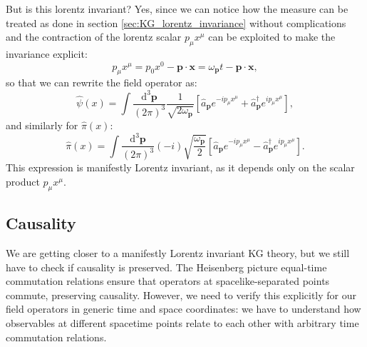 But is this lorentz invariant? Yes, since we can notice how the measure can be treated as done in section \ref{sec:KG_lorentz_invariance} without complications and the contraction of the lorentz scalar \(p_{\mu}x^{\mu}\) can be exploited to make the invariance explicit:
\[
    p_\mu x^{\mu} = p_0 x^0 - \mathbf{p} \cdot \mathbf{x} = \omega_{\mathbf{p}} t - \mathbf{p} \cdot \mathbf{x},
\]
so that we can rewrite the field operator as:
\[
    \hat{\psi} (x) = \int \frac{\mathrm{d}^3 \mathbf{p}}{(2\pi)^3} \frac{1}{\sqrt{2\omega_{\mathbf{p}}}} \left[ \hat{a}_{\mathbf{p}} e^{-i p_{\mu} x^{\mu}} + \hat{a}^{\dagger}_{\mathbf{p}} e^{i p_{\mu} x^{\mu}} \right],
\]
and similarly for \(\hat{\pi}(x)\):
\[
    \hat{\pi} (x) = \int \frac{\mathrm{d}^3 \mathbf{p}}{(2\pi)^3} (-i) \sqrt{\frac{\omega_{\mathbf{p}}}{2}} \left[ \hat{a}_{\mathbf{p}} e^{-i p_{\mu} x^{\mu}} - \hat{a}^{\dagger}_{\mathbf{p}} e^{i p_{\mu} x^{\mu}} \right].
\]
This expression is manifestly Lorentz invariant, as it depends only on the scalar product \(p_{\mu} x^{\mu}\).

\subsection{Causality}

We are getting closer to a manifestly Lorentz invariant KG theory, but we still have to check if causality is preserved. The Heisenberg picture equal-time commutation relations ensure that operators at spacelike-separated points commute, preserving causality. However, we need to verify this explicitly for our field operators in generic time and space coordinates: we have to understand how observables at different spacetime points relate to each other with arbitrary time commutation relations.


